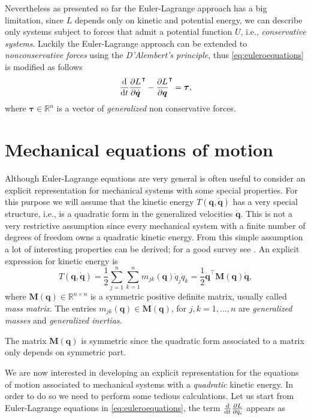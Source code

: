 		Nevertheless as presented so far the Euler-Lagrange approach has a big limitation, since $L$ depends only on kinetic and potential energy, we can describe only systems subject to forces that admit a potential function $U$, i.e., \emph{conservative systems}. Luckily the Euler-Lagrange approach can be extended to \emph{nonconservative forces} using the \emph{D'Alembert's principle}, thus \cref{eq:euleroequations} is modified as follows
		\begin{equation}
			\frac{\mathop{}\!\mathrm{d}}{\mathop{}\!\mathrm{d} t}\frac{\partial L}{\partial\dot{\bm{q}}}^{\intercal}-\frac{\partial L}{\partial \bm{q}}^{\intercal} = \bm{\tau},
		\end{equation}
		where $\bm{\tau}\in\mathbb{R}^{n}$ is a vector of \emph{generalized} non conservative forces.
		
	\section{Mechanical equations of motion}	
		Although Euler-Lagrange equations are very general is often useful to consider an explicit representation for mechanical systems with some special properties. For this purpose we will assume that the kinetic energy $T(\bm{q},\dot{\bm{q}})$ has a very special structure, i.e., is a quadratic form in the generalized velocities $\dot{\bm{q}}$. This is not a very restrictive assumption since every mechanical system with  a finite number of degrees of freedom owns a quadratic kinetic energy. From this simple assumption a lot of interesting properties can be derived; for a good survey see \cite{siciliano2009robotics}. An explicit expression for kinetic energy is
		\begin{equation}
			T(\bm{q},\dot{\bm{q}}) = \frac{1}{2}\sum_{j=1}^{n}\sum_{k=1}^{n}m_{jk}(\bm{q})\dot{q}_{j}\dot{q}_{k} = \frac{1}{2}\dot{\bm{q}}^{\intercal}\bm{M}(\bm{q})\dot{\bm{q}},
		\end{equation}
		where $\bm{M}(\bm{q})\in\mathbb{R}^{n\times n}$ is a symmetric positive definite matrix, usually called \emph{mass matrix}. The entries $m_{jk}(\bm{q})\in\bm{M}(\bm{q})$, for $j,k=1,\dots,n$ are \emph{generalized masses} and \emph{generalized inertias}.
		\begin{remark}
			The matrix $\bm{M}(\bm{q})$ is symmetric since the quadratic form associated to a matrix only depends on symmetric part.
		\end{remark}
		We are now interested in developing an explicit representation for the equations of motion associated to mechanical systems with a \emph{quadratic} kinetic energy. In order to do so we need to perform some tedious calculations. Let us start from Euler-Lagrange equations in \cref{eq:euleroequations}, the term $\frac{\mathop{}\!\mathrm{d}}{\mathop{}\!\mathrm{d} t}\frac{\partial L}{\partial \dot{q}_{i}}$ appears as
